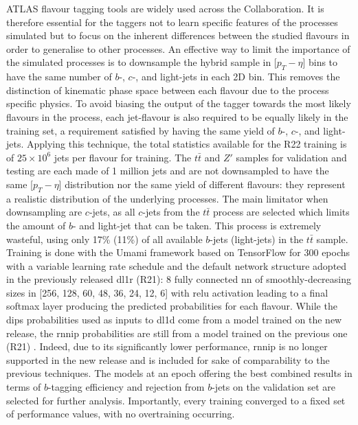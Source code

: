 ATLAS flavour tagging tools are widely used across the Collaboration. It is therefore essential for the taggers not to learn specific features of the processes simulated but to focus on the inherent differences between the studied flavours in order to generalise to other processes. An effective way to limit the importance of the simulated processes is to downsample the hybrid sample in [$p_T - \eta$] bins to have the same number of $b$-, $c$-, and light-jets in each 2D bin. This removes the distinction of kinematic phase space between each flavour due to the process specific physics. To avoid biasing the output of the tagger towards the most likely flavours in the process, each jet-flavour is also required to be equally likely in the training set, a requirement satisfied by having the same yield of $b$-, $c$-, and light-jets. Applying this technique, the total statistics available for the R22 training is of $25 \times 10^{6}$ jets per flavour for training. The $t\bar{t}$ and $Z'$ samples for validation and testing are each made of 1 million jets and are not downsampled to have the same [$p_T - \eta$] distribution nor the same yield of different flavours: they represent a realistic distribution of the underlying processes. The main limitator when downsampling are $c$-jets, as all $c$-jets from the $t\bar{t}$ process are selected which limits the amount of $b$- and light-jet that can be taken. This process is extremely wasteful, using only 17\% (11\%) of all available $b$-jets (light-jets) in the $t\bar{t}$ sample.\\

Training is done with the Umami framework \cite{Umami} based on TensorFlow \cite{tensorflow2015-whitepaper} for 300 epochs with a variable learning rate schedule and the default network structure adopted in the previously released \gls{dl1r} (R21): 8 fully connected \gls{nn} of smoothly-decreasing sizes in [256, 128, 60, 48, 36, 24, 12, 6] with \gls{relu} activation leading to a final softmax layer producing the predicted probabilities for each flavour. While the \gls{dips} probabilities used as inputs to \gls{dl1d} come from a model trained on the new release, the \gls{rnnip} probabilities are still from a model trained on the previous one (R21) \cite{ATL-PHYS-PUB-2017-003, ATL-PHYS-PUB-2020-014}. Indeed, due to its significantly lower performance, \gls{rnnip} is no longer supported in the new release and is included for sake of comparability to the previous techniques. The models at an epoch offering the best combined results in terms of $b$-tagging efficiency and rejection from $b$-jets on the validation set are selected for further analysis. Importantly, every training converged to a fixed set of performance values, with no overtraining occurring.\\

